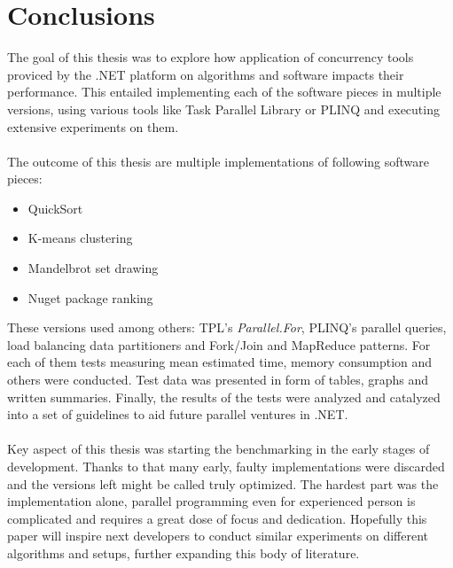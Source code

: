 \chapter{Conclusions}
The goal of this thesis was to explore how application of concurrency tools proviced by the .NET platform
on algorithms and software impacts their performance. This entailed implementing each of the software pieces
in multiple versions, using various tools like Task Parallel Library or PLINQ and executing extensive experiments on them.
\\ \\ 
The outcome of this thesis are multiple implementations of following software pieces: 
\begin{itemize}
	\item QuickSort
	\item K-means clustering
	\item Mandelbrot set drawing
	\item Nuget package ranking
\end{itemize}

These versions used among others: TPL's \emph{Parallel.For}, PLINQ's parallel queries, load balancing data partitioners and Fork/Join and MapReduce patterns.
For each of them tests measuring mean estimated time, memory consumption and others were conducted. 
Test data was presented in form of tables, graphs and written summaries. 
Finally, the results of the tests were analyzed and catalyzed into a set of guidelines to aid future parallel ventures in .NET. 
\\ \\ 
Key aspect of this thesis was starting the benchmarking in the early stages of development. Thanks to that many early, faulty implementations were discarded and the versions left might be called truly optimized. The hardest part was the implementation alone, parallel programming even for experienced person is complicated and requires a great dose of focus and dedication. Hopefully this paper will inspire next developers to conduct similar experiments on different algorithms and setups, further expanding this body of literature. 